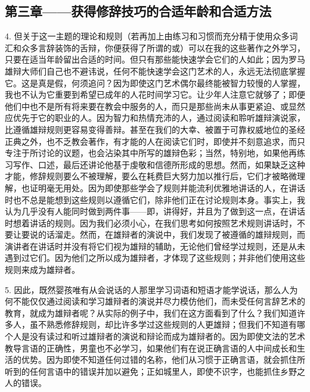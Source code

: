
\subsection{第三章——获得修辞技巧的合适年龄和合适方法}

4. 但关于这一主题的理论和规则（若再加上由练习和习惯而充分精于使用众多词汇和众多言辞装饰的舌辩，你便获得了所谓的或）可以在我的这些著作之外学习，只要在适当年龄留出合适的时间。但只有那些能快速学会它们的人如此；因为罗马雄辩大师们自己也不避讳说，任何不能快速学会这门艺术的人，永远无法彻底掌握它。这是真是假，何须追问？因为即使这门艺术偶尔最终能被智力较慢的人掌握，我也不认为它重要到希望已成年的人花时间学习它。让少年人注意它就够了；即便他们中也不是所有将来要在教会中服务的人，而只是那些尚未从事更紧迫、或显然应优先于它的职业的人。因为智力和热情充沛的人，通过阅读和聆听雄辩演说家，比遵循雄辩规则更容易变得善辩。甚至在我们的大幸、被置于可靠权威地位的圣经正典之外，也不乏教会著作，有才能的人在阅读它们时，即使并不刻意追求，而只专注于所讨论的议题，也会沾染其中所写的雄辩色彩；当然，特别地，如果他再练习写作、口述，最后还讲论他基于虔敬和信德所形成的思想。然而，如果缺乏这种才能，修辞规则要么不被理解，要么在耗费巨大努力加以推行后，它们才被略微理解，也证明毫无用处。因为即使那些学会了规则并能流利优雅地讲话的人，在讲话时也不总是能想到这些规则以遵循它们，除非他们正在讨论规则本身。事实上，我认为几乎没有人能同时做到两件事——即，讲得好，并且为了做到这一点，在讲话时想着讲话的规则。因为我们必须小心，在我们思考如何按照艺术规则讲话时，不要让要说的话溜走。然而，在雄辩者的演说中，我们发现了被遵循的雄辩规则，而演讲者在讲话时并没有将它们视为雄辩的辅助，无论他们曾经学过规则，还是从未遇到过它们。因为他们之所以成为雄辩者，才体现了这些规则；并非他们使用这些规则来成为雄辩者。\par

5. 因此，既然婴孩唯有从会说话的人那里学习词语和短语才能学说话，那么人为何不能仅仅通过阅读和学习雄辩者的演说并尽力模仿他们，而未受任何言辞艺术的教育，就成为雄辩者呢？从实际的例子中，我们在这方面看到了什么？我们知道许多人，虽不熟悉修辞规则，却比许多学过这些规则的人更雄辩；但我们不知道有哪个人是没有读过和听过雄辩者的演说和辩论而成为雄辩者的。因为即使文法的艺术教导言语的正确性，男童也不必学习，如果他们有在说正确言语的人中间成长和生活的优势。因为即使不知道任何过错的名称，他们从习惯于正确言语，就会抓住所听到的任何言语中的错误并加以避免；正如城里人，即使不识字，也能抓住乡野之人的错误。\par

